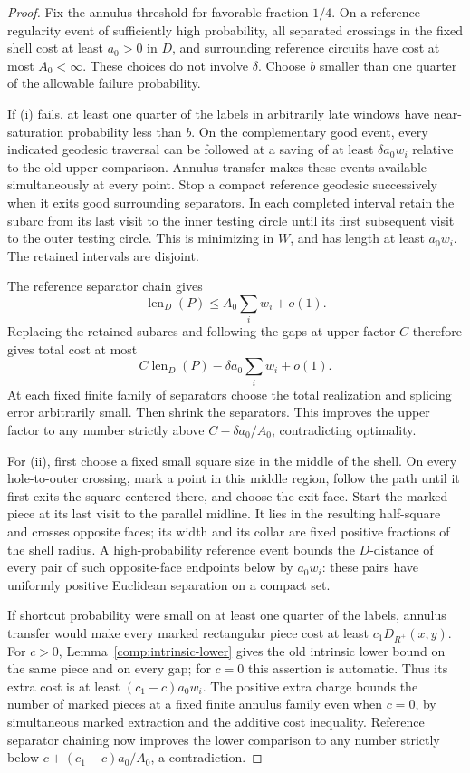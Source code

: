 \begin{proof}
Fix the annulus threshold for favorable fraction $1/4$.  On a reference
regularity event of sufficiently high probability, all separated
crossings in the fixed shell cost at least $a_0>0$ in $D$, and surrounding
reference circuits have cost at most $A_0<\infty$.  These choices do not
involve $\delta$.  Choose $b$ smaller than one quarter of the allowable
failure probability.

If (i) fails, at least one quarter of the labels in arbitrarily late
windows have near-saturation probability less than $b$.  On the
complementary good event, every indicated geodesic traversal can be
followed at a saving of at least $\delta a_0w_i$ relative to the old
upper comparison.  Annulus transfer makes these events available
simultaneously at every point.  Stop a compact reference geodesic
successively when it exits good surrounding separators.  In each
completed interval retain the subarc from its last visit to the inner
testing circle until its first subsequent visit to the outer testing
circle.  This is minimizing in $W$, and has length at least $a_0w_i$.
The retained intervals are disjoint.

The reference separator chain gives
\[
 \operatorname{len}_D(P)\le A_0\sum_iw_i+o(1).
\]
Replacing the retained subarcs and following the gaps at upper factor
$C$ therefore gives total cost at most
\[
 C\operatorname{len}_D(P)-\delta a_0\sum_iw_i+o(1).
\]
At each fixed finite family of separators choose the total realization
and splicing error arbitrarily small.  Then shrink the separators.
This improves the upper factor to any number strictly above
$C-\delta a_0/A_0$, contradicting optimality.

For (ii), first choose a fixed small square size in the middle of the
shell.  On every hole-to-outer crossing, mark a point in this middle
region, follow the path until it first exits the square centered there,
and choose the exit face.  Start the marked piece at its last visit to
the parallel midline.  It lies in the resulting half-square and crosses
opposite faces; its width and its collar are fixed positive fractions
of the shell radius.  A high-probability reference event bounds the
$D$-distance of every pair of such opposite-face endpoints below by
$a_0w_i$: these pairs have uniformly positive Euclidean separation on
a compact set.

If shortcut probability were small on at least one quarter of the
labels, annulus transfer would make every marked rectangular piece
cost at least $c_1D_{R^+}(x,y)$.  For $c>0$, Lemma~\ref{comp:intrinsic-lower}
gives the old intrinsic lower bound on the same piece and on every gap;
for $c=0$ this assertion is automatic.  Thus its extra cost is at least
$(c_1-c)a_0w_i$.  The positive extra charge bounds the number of marked
pieces at a fixed finite annulus family even when $c=0$, by simultaneous
marked extraction and the additive cost inequality.  Reference
separator chaining now improves the lower comparison to any number
strictly below $c+(c_1-c)a_0/A_0$, a contradiction.


\end{proof}
